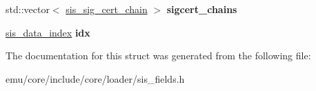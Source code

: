 \begin{DoxyCompactItemize}
\item 
\mbox{\label{structeka2l1_1_1loader_1_1sis__controller_ab33e855d2ec297f5f3443a6fb40e2a77}} 
std\+::vector$<$ \mbox{\hyperlink{structeka2l1_1_1loader_1_1sis__sig__cert__chain}{sis\+\_\+sig\+\_\+cert\+\_\+chain}} $>$ {\bfseries sigcert\+\_\+chains}
\item 
\mbox{\label{structeka2l1_1_1loader_1_1sis__controller_a818595d676d9ef856269bb6792a1e09f}} 
\mbox{\hyperlink{structeka2l1_1_1loader_1_1sis__data__index}{sis\+\_\+data\+\_\+index}} {\bfseries idx}
\end{DoxyCompactItemize}


The documentation for this struct was generated from the following file\+:\begin{DoxyCompactItemize}
\item 
emu/core/include/core/loader/sis\+\_\+fields.\+h\end{DoxyCompactItemize}
